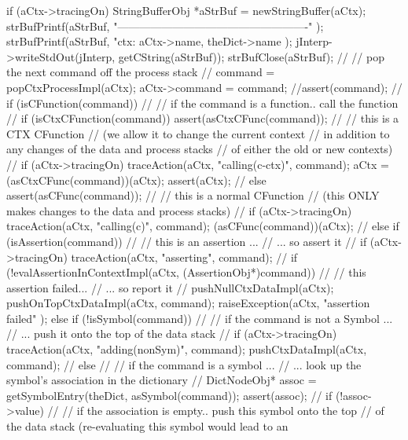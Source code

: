 {{    if (aCtx->tracingOn) {
      StringBufferObj *aStrBuf = newStringBuffer(aCtx);
      strBufPrintf(aStrBuf,
        "\n----------------------------------------------------\n"
      );
      strBufPrintf(aStrBuf,
        "ctx: %
        aCtx->name, theDict->name
      );
      jInterp->writeStdOut(jInterp, getCString(aStrBuf));
      strBufClose(aStrBuf);
    }
    //
    // pop the next command off the process stack
    //
    command = popCtxProcessImpl(aCtx);
    aCtx->command = command;
    //assert(command);
    //
   if (isCFunction(command)) {
      //
      // if the command is a function.. call the function
      //
      if (isCtxCFunction(command)) {
        assert(asCtxCFunc(command));
        //
        // this is a CTX CFunction
        // (we allow it to change the current context
        //  in addition to any changes of the data and process stacks
        //  of either the old or new contexts)
        //
        if (aCtx->tracingOn) 
          traceAction(aCtx, "calling(c-ctx)", command);
        aCtx = (asCtxCFunc(command))(aCtx);
        assert(aCtx);
        //
      } else {
        assert(asCFunc(command));
        //
        // this is a normal CFunction
        // (this ONLY makes changes to the data and process stacks)
        //
        if (aCtx->tracingOn) 
          traceAction(aCtx, "calling(c)", command);
        (asCFunc(command))(aCtx);
        //
      }
    } else if (isAssertion(command)) {
      //
      // this is an assertion ...
      //   ... so assert it 
      //
      if (aCtx->tracingOn) 
        traceAction(aCtx, "asserting", command);
      //
      if (!evalAssertionInContextImpl(aCtx, (AssertionObj*)command)) {
        //
        // this assertion failed... 
        //   ... so report it
        //
        pushNullCtxDataImpl(aCtx);
        pushOnTopCtxDataImpl(aCtx, command);
        raiseException(aCtx,
          "assertion failed"
        );
      }
    } else if (!isSymbol(command)) {
      //
      // if the command is not a Symbol ...
      //  ...  push it onto the top of the data stack
      //
      if (aCtx->tracingOn)
        traceAction(aCtx, "adding(nonSym)", command);
      pushCtxDataImpl(aCtx, command);
      //
   } else {
      //
      // if the command is a symbol ...
      //  ... look up the symbol's association in the dictionary
      //
      DictNodeObj* assoc = getSymbolEntry(theDict, asSymbol(command));
      assert(assoc);
      //
      if (!assoc->value) {
        //
        // if the association is empty.. push this symbol onto the top
        // of the data stack (re-evaluating this symbol would lead to an
}}}}
